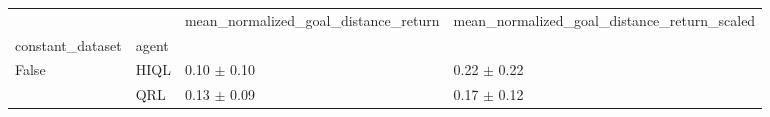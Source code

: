 \begin{tabular}{llll}
\toprule
 &  & mean_normalized_goal_distance_return & mean_normalized_goal_distance_return_scaled \\
constant_dataset & agent &  &  \\
\midrule
\multirow[t]{2}{*}{False} & HIQL & 0.10 $\pm$ 0.10 & 0.22 $\pm$ 0.22 \\
 & QRL & 0.13 $\pm$ 0.09 & 0.17 $\pm$ 0.12 \\
\cline{1-4}
\bottomrule
\end{tabular}
